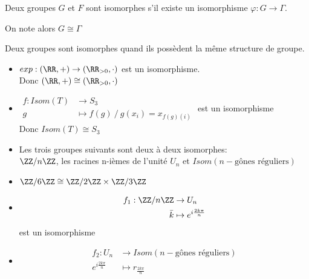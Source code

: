 \documentclass[../main.tex]{subfile}
\begin{document}
\begin{defi}
	Deux groupes $G$ et $F$ sont isomorphes s'il existe un isomorphisme $\varphi : G \to \Gamma$.
\begin{nota}	
	On note alors $G \cong \Gamma$
\end{nota}
\end{defi}

\begin{rema}
	Deux groupes sont isomorphes quand ils possèdent la même structure de groupe.
\end{rema}

\begin{ex}
\begin{itemize}	
	\item $exp : (\RR, +) \to (\RR_{>0}, \cdot)$ est un isomorphisme.\\
	Donc $(\RR, +) \cong (\RR_{>0}, \cdot)$
	\item $
\begin{aligned}
	f: Isom(T) &\to S_3\\
	g &\mapsto f(g) \ / \ g(x_i) = x_{f(g)(i)}
\end{aligned}$ est un isomorphisme\\
	Donc $Isom(T) \cong S_3$

	\item Les trois groupes suivants sont deux à deux isomorphes:\\
	$\ZZ / n\ZZ$, les racines n-ièmes de l'unité $U_n$ et $Isom(n-\text{gônes réguliers})$

	\item $\ZZ / 6\ZZ \cong \ZZ/2\ZZ \times \ZZ/3\ZZ$

	\item 
	$$
\begin{aligned}
	f_1: \ZZ/n\ZZ &\to U_n\\
	\bar{k} &\mapsto e^{i\frac{2k\pi}{n}}
\end{aligned}
	$$
	est un isomorphisme

	\item
	$$
\begin{aligned}
	f_2: U_n &\to Isom(n-\text{gônes réguliers})\\
	e^{i\frac{2k\pi}{n}} &\mapsto r_{\frac{2k\pi}{n}}
\end{aligned}
	$$
\end{itemize}
\end{ex}
\end{document}
